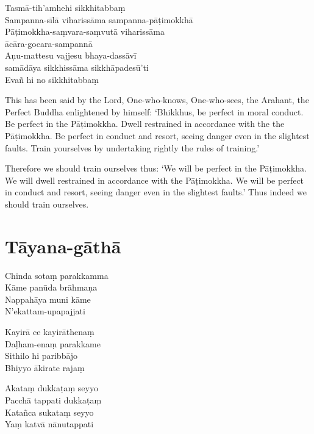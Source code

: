 Tasmā-tih'amhehi sikkhitabbaṃ\\
Sampanna-sīlā viharissāma sampanna-pāṭimokkhā\\
Pāṭimokkha-saṃvara-saṃvutā viharissāma\\
ācāra-gocara-sampannā\\
Aṇu-mattesu vajjesu bhaya-dassāvī\\
samādāya sikkhissāma sikkhāpadesū'ti\\
Evañ hi no sikkhitabbaṃ


\begin{english}
  This has been said by the Lord, One-who-knows, One-who-sees, the Arahant, the
  Perfect Buddha enlightened by himself: `Bhikkhus, be perfect in moral
  conduct. Be perfect in the Pāṭimokkha. Dwell restrained in accordance with the
  the Pāṭimokkha. Be perfect in conduct and resort, seeing danger even in the
  slightest faults. Train yourselves by undertaking rightly the rules of training.'

  Therefore we should train ourselves thus: `We will be perfect in the
  Pāṭimokkha. We will dwell restrained in accordance with the Pāṭimokkha. We
  will be perfect in conduct and resort, seeing danger even in the slightest
  faults.' Thus indeed we should train ourselves.
\end{english}


\section{Tāyana-gāthā}

\begin{leader}
\end{leader}


Chinda sotaṃ parakkamma\\
Kāme panūda brāhmaṇa\\
Nappahāya muni kāme\\
N'ekattam-upapajjati

Kayirā ce kayirāthenaṃ\\
Daḷham-enaṃ parakkame\\
Sithilo hi paribbājo\\
Bhiyyo ākirate rajaṃ

Akataṃ dukkaṭaṃ seyyo\\
Pacchā tappati dukkaṭaṃ\\
Katañca sukataṃ seyyo\\
Yaṃ katvā nānutappati

